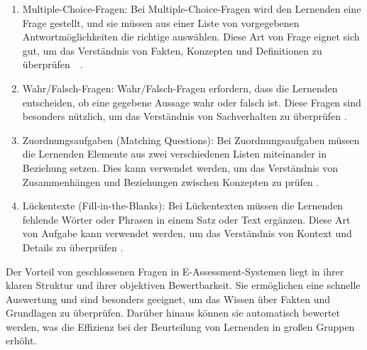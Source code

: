 \begin{enumerate}
    \item Multiple-Choice-Fragen: Bei Multiple-Choice-Fragen wird den Lernenden eine Frage gestellt, und sie müssen aus einer Liste von vorgegebenen Antwortmöglichkeiten die richtige auswählen. Diese Art von Frage eignet sich gut, um das Verständnis von Fakten, Konzepten und Definitionen zu überprüfen~\cite{azevedo2019assessment}~\cite{azevedo2015assessment}.

    \item Wahr/Falsch-Fragen: Wahr/Falsch-Fragen erfordern, dass die Lernenden entscheiden, ob eine gegebene Aussage wahr oder falsch ist. Diese Fragen sind besonders nützlich, um das Verständnis von Sachverhalten zu überprüfen \cite{khdour2020semantic}.

    \item Zuordnungsaufgaben (Matching Questions): Bei Zuordnungsaufgaben müssen die Lernenden Elemente aus zwei verschiedenen Listen miteinander in Beziehung setzen. Dies kann verwendet werden, um das Verständnis von Zusammenhängen und Beziehungen zwischen Konzepten zu prüfen \cite{gruttmann2009formatives}.

    \item Lückentexte (Fill-in-the-Blanks): Bei Lückentexten müssen die Lernenden fehlende Wörter oder Phrasen in einem Satz oder Text ergänzen. Diese Art von Aufgabe kann verwendet werden, um das Verständnis von Kontext und Details zu überprüfen \cite{gruttmann2009formatives}.
    
\end{enumerate}

Der Vorteil von geschlossenen Fragen in E-Assessment-Systemen liegt in ihrer klaren Struktur und ihrer objektiven Bewertbarkeit. Sie ermöglichen eine schnelle Auswertung und sind besonders geeignet, um das Wissen über Fakten und Grundlagen zu überprüfen. Darüber hinaus können sie automatisch bewertet werden, was die Effizienz bei der Beurteilung von Lernenden in großen Gruppen erhöht.

